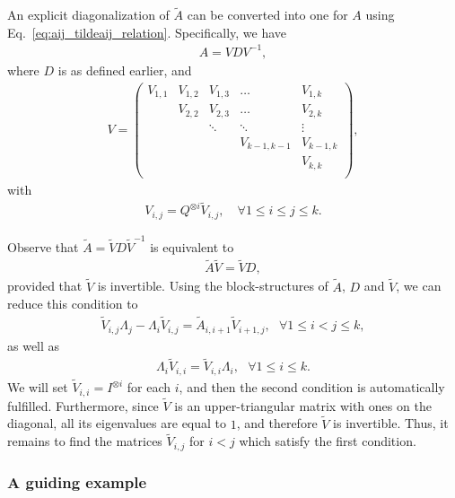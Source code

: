 \documentclass[superscriptaddress,onecolumn,nofootinbib,longbibliography,a4paper,accepted=2026-09-29]{quantumarticle}
\theoremstyle{plain}
\theoremstyle{definition}
\numberwithin{thm}{section}
\numberwithin{assumption}{section}
\numberwithin{lemma}{section}
\numberwithin{prop}{section}
\numberwithin{cor}{section}
\numberwithin{definition}{section}
\numberwithin{rmk}{section}
\numberwithin{equation}{section}
\begin{document}
An explicit diagonalization of $\tilde{A}$ can be converted into one for $A$ using Eq.~\eqref{eq:aij_tildeaij_relation}. Specifically, we have
\begin{align}
    A=V D V^{-1},    
\end{align}
where $D$ is as defined earlier, and
\begin{align}
        {V}=\begin{pmatrix}
        {V}_{1,1}  & {V}_{1,2}   &  {V}_{1,3} & \dots  & {V}_{1,k} \\
                 & {V}_{2,2}   &  {V}_{2,3} & \dots & {V}_{2,k} \\
                 &           & \ddots &   \ddots       & \vdots \\
                 &           &          & {V}_{k-1,k-1} & {V}_{k-1, k} \\
                &           &          &  & {V}_{k, k} \\\end{pmatrix},     
\end{align}
with 
\begin{align}
    V_{i,j}=Q^{\otimes i} \tilde{V}_{i,j},\quad \forall 1\le i\le j\le k.
\end{align}

Observe that $\tilde{A}=\tilde{V}D\tilde{V}^{-1}$ is equivalent to 
\begin{align}
    \tilde{A}\tilde{V}=\tilde{V}D,    
\end{align}
provided that $\tilde{V}$ is invertible. Using the block-structures of $\tilde{A}$, $D$ and $\tilde{V}$, we can reduce this condition to
\begin{align}
\label{eq:V_recurrence}
    \tilde{V}_{i,j}\Lambda_j-\Lambda_i \tilde{V}_{i,j} =\tilde{A}_{i,i+1}\tilde{V}_{i+1,j},~~~\forall 1\le i<j \le k,
\end{align}
as well as
\begin{align}
    \Lambda_i \tilde{V}_{i,i}=\tilde{V}_{i,i}\Lambda_i,~~~\forall 1\le i\le k.
\end{align}
We will set $\tilde{V}_{i,i}=I^{\otimes i}$ for each $i$, and then the second condition is automatically fulfilled. Furthermore, since $\tilde{V}$ is an upper-triangular matrix with ones on the diagonal, all its eigenvalues are equal to $1$, and therefore $\tilde{V}$ is invertible.
Thus, it remains to find the matrices $\tilde{V}_{i,j}$ for $i<j$ which satisfy the first condition.

\subsubsection{A guiding example}
\label{subsubsec:guiding_example}
\end{document}
